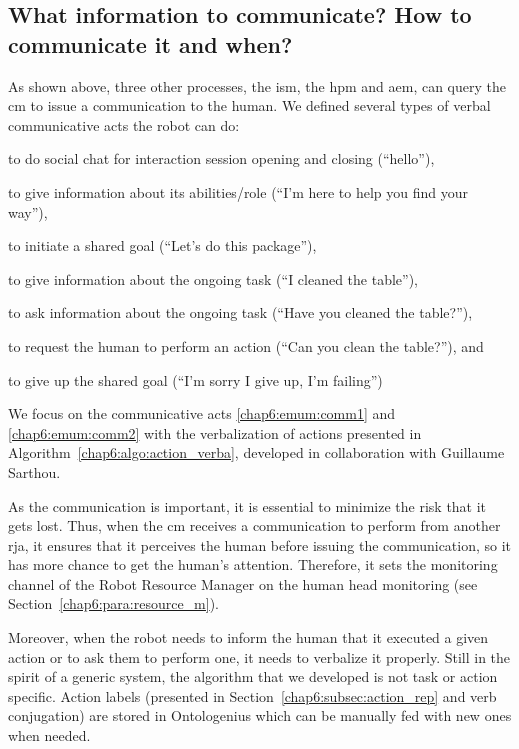 \documentclass[a4paper,11pt,twoside]{StyleThese}
\begin{document}
\subsection{What information to communicate? How to communicate it and when?}\label{chap6:subsec:info_comm}
As shown above, three other processes, the \acrlong{ism}, the \acrlong{hpm} and \acrlong{aem}, can query the \acrshort{cm} to issue a communication to the human. We defined several types of verbal communicative acts the robot can do:
\begin{enumList}
	\item to do social chat for interaction session opening and closing (\eg ``hello''),
	\item to give information about its abilities/role (\eg ``I'm here to help you find your way''),
	\item to initiate a shared goal (\eg ``Let's do this package''),
	\item to give information about the ongoing task (\eg ``I cleaned the table''),\label{chap6:emum:comm1}
	\item to ask information about the ongoing task (\eg ``Have you cleaned the table?''),
	\item to request the human to perform an action (\eg ``Can you clean the table?''), and\label{chap6:emum:comm2}
	\item to give up the shared goal (\eg ``I'm sorry I give up, I'm failing'')
\end{enumList}

We focus on the communicative acts \ref{chap6:emum:comm1} and \ref{chap6:emum:comm2} with the verbalization of actions presented in Algorithm~\ref{chap6:algo:action_verba}, developed in collaboration with Guillaume Sarthou. 

As the communication is important, it is essential to minimize the risk that it gets lost. Thus, when the \acrshort{cm} receives a communication to perform from another \acrshort{rja}, it ensures that it perceives the human before issuing the communication, so it has more chance to get the human's attention. Therefore, it sets the monitoring channel of the Robot Resource Manager on the human head monitoring (see Section~\ref{chap6:para:resource_m}).

Moreover, when the robot needs to inform the human that it executed a given action or to ask them to perform one, it needs to verbalize it properly. Still in the spirit of a generic system, the algorithm that we developed is not task or action specific. Action labels (presented in Section~\ref{chap6:subsec:action_rep} and verb conjugation) are stored in Ontologenius which can be manually fed with new ones when needed.
\end{document}
